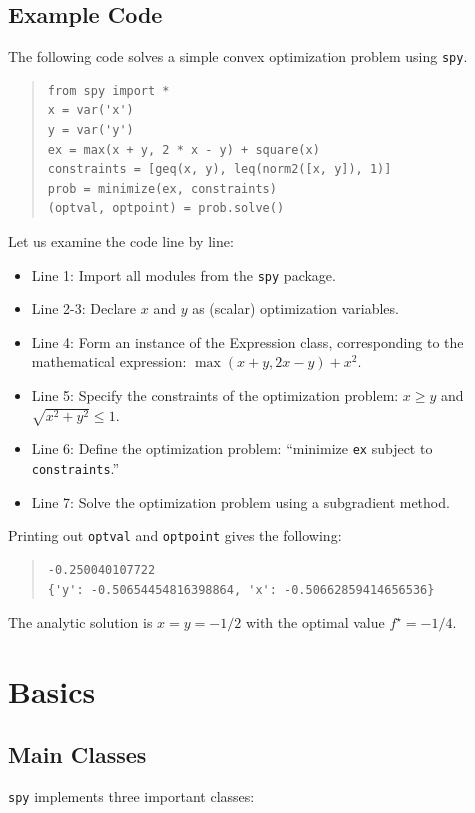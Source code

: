 \documentclass[12pt]{article}
\begin{document}
\subsection{Example Code}
The following code solves a simple convex optimization problem using \verb'spy'.

\begin{quote}
\begin{verbatim}
from spy import *
x = var('x')
y = var('y')
ex = max(x + y, 2 * x - y) + square(x)
constraints = [geq(x, y), leq(norm2([x, y]), 1)]
prob = minimize(ex, constraints)
(optval, optpoint) = prob.solve()
\end{verbatim}
\end{quote}

\noindent Let us examine the code line by line:

\begin{itemize}
\item Line 1: Import all modules from the \verb'spy' package.
\item Line 2-3: Declare $x$ and $y$ as (scalar) optimization variables.
\item Line 4: Form an instance of the Expression class, corresponding to the mathematical expression: $\max(x+y,2x-y)+x^2$.
\item Line 5: Specify the constraints of the optimization problem: $x \geq y$ and $\sqrt{x^2+y^2} \leq 1$.
\item Line 6: Define the optimization problem: ``minimize \verb'ex' subject to \verb'constraints'.''
\item Line 7: Solve the optimization problem using a subgradient method.
\end{itemize}

\noindent Printing out \verb'optval' and \verb'optpoint' gives the following:

\begin{quote}
\begin{verbatim}
-0.250040107722
{'y': -0.50654454816398864, 'x': -0.50662859414656536}
\end{verbatim}
\end{quote}

\noindent The analytic solution is $x=y=-1/2$ with the optimal value $f^\star = -1/4$.

\section{Basics}

\subsection{Main Classes}
\verb'spy' implements three important classes:
\end{document}
